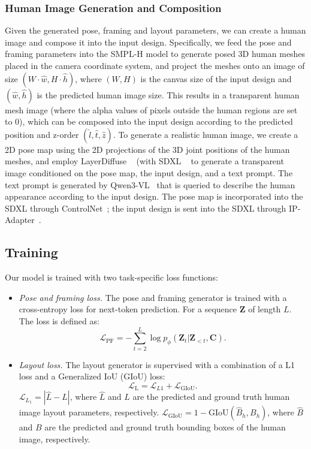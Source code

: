 \subsubsection{Human Image Generation and Composition}
Given the generated pose, framing and layout parameters, we can create a human image and compose it into the input design. Specifically, we feed the pose and framing parameters into the SMPL-H model to generate posed 3D human meshes placed in the camera coordinate system, and project the meshes onto an image of size $(W \cdot \hat{w}, H \cdot \hat{h})$, where $(W, H)$ is the canvas size of the input design and $(\hat{w}, \hat{h})$ is the predicted human image size. This results in a transparent human mesh image (where the alpha values of pixels outside the human regions are set to 0), which can be composed into the input design according to the predicted position and z-order $(\hat{l}, \hat{t}, \hat{z})$. To generate a realistic human image, we create a 2D pose map using the 2D projections of the 3D joint positions of the human meshes, and employ LayerDiffuse ~\cite{layerdiffuse} (with SDXL ~\cite{podell2023sdxl} to generate a transparent image conditioned on the pose map, the input design, and a text prompt. The text prompt is generated by Qwen3-VL~\cite{Qwen3-VL} that is queried to describe the human appearance according to the input design. The pose map is incorporated into the SDXL through ControlNet~\cite{controlnet}; the input design is sent into the SDXL through IP-Adapter~\cite{ye2023ipadaptertextcompatibleimage}.

\subsection{Training}
\label{sec:training}

Our model is trained with two task-specific loss functions:

\begin{itemize}
    \item \textit{Pose and framing loss.} The pose and framing generator is trained with a cross-entropy loss for next-token prediction. For a sequence $\mathbf{Z}$ of length $L$. The loss is defined as:
    \begin{equation}
        \mathcal{L}_{\text{PF}} = -\sum_{t=2}^{L} \log p_{\phi}(\mathbf{Z}_t | \mathbf{Z}_{<t}, \mathbf{C}).
    \end{equation}

    \item \textit{Layout loss.} The layout generator is supervised with a combination of a L1 loss and a Generalized IoU (GIoU) loss:
    \begin{equation}
        \mathcal{L}_{\text{L}} = \mathcal{L}_{L1} + \mathcal{L}_{\text{GIoU}}.
    \end{equation}
    $\mathcal{L}_{L_1} = \left| \hat{L} - L \right|$, where $\hat{L}$ and $L$ are the predicted and ground truth human image layout parameters, respectively. $ \mathcal{L}_{\text{GIoU}} = 1 - \text{GIoU}(\hat{B}_{h}, B_{h})$, where $\hat{B}$ and $B$ are the predicted and ground truth bounding boxes of the human image, respectively.

\end{itemize}

